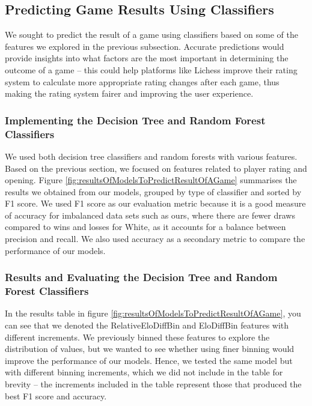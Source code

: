 \documentclass[a4paper, 11pt]{article}
\begin{document}
\subsection{Predicting Game Results Using Classifiers}
We sought to predict the result of a game using classifiers based on some of the features we explored in the previous subsection. Accurate predictions would provide insights into what factors are the most important in determining the outcome of a game -- this could help platforms like Lichess improve their rating system to calculate more appropriate rating changes after each game, thus making the rating system fairer and improving the user experience.

\subsubsection{Implementing the Decision Tree and Random Forest Classifiers}
We used both decision tree classifiers and random forests with various features. Based on the previous section, we focused on features related to player rating and opening. Figure \ref{fig:resultsOfModelsToPredictResultOfAGame} summarises the results we obtained from our models, grouped by type of classifier and sorted by F1 score. We used F1 score as our evaluation metric because it is a good measure of accuracy for imbalanced data sets such as ours, where there are fewer draws compared to wins and losses for White, as it accounts for a balance between precision and recall. We also used accuracy as a secondary metric to compare the performance of our models.

\subsubsection{Results and Evaluating the Decision Tree and Random Forest Classifiers}
In the results table in figure \ref{fig:resultsOfModelsToPredictResultOfAGame}, you can see that we denoted the RelativeEloDiffBin and EloDiffBin features with different increments. We previously binned these features to explore the distribution of values, but we wanted to see whether using finer binning would improve the performance of our models. Hence, we tested the same model but with different binning increments, which we did not include in the table for brevity -- the increments included in the table represent those that produced the best F1 score and accuracy.
\end{document}
